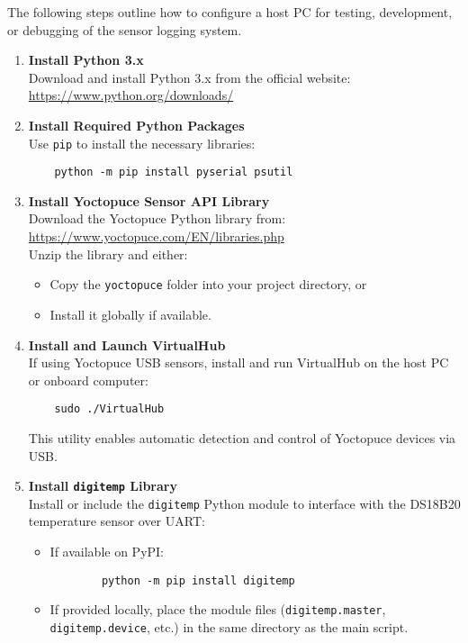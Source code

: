 \documentclass[../main.tex]{subfiles}
\begin{document}
The following steps outline how to configure a host PC for testing, development, or debugging of the sensor logging system.

\begin{enumerate}
    \item \textbf{Install Python 3.x} \\
    Download and install Python 3.x from the official website: \\
    \url{https://www.python.org/downloads/}
    
    \item \textbf{Install Required Python Packages} \\
    Use \texttt{pip} to install the necessary libraries:
    \begin{verbatim}
    python -m pip install pyserial psutil
    \end{verbatim}

    \item \textbf{Install Yoctopuce Sensor API Library} \\
    Download the Yoctopuce Python library from: \\
    \url{https://www.yoctopuce.com/EN/libraries.php} \\
    Unzip the library and either:
    \begin{itemize}
        \item Copy the \texttt{yoctopuce} folder into your project directory, or
        \item Install it globally if available.
    \end{itemize}

    \item \textbf{Install and Launch VirtualHub} \\
    If using Yoctopuce USB sensors, install and run VirtualHub on the host PC or onboard computer:
    \begin{verbatim}
    sudo ./VirtualHub
    \end{verbatim}
    This utility enables automatic detection and control of Yoctopuce devices via USB.

    \item \textbf{Install \texttt{digitemp} Library} \\
    Install or include the \texttt{digitemp} Python module to interface with the DS18B20 temperature sensor over UART:
    \begin{itemize}
        \item If available on PyPI:
        \begin{verbatim}
        python -m pip install digitemp
        \end{verbatim}
        \item If provided locally, place the module files (\texttt{digitemp.master}, \texttt{digitemp.device}, etc.) in the same directory as the main script.
    \end{itemize}

\end{enumerate}
\end{document}

